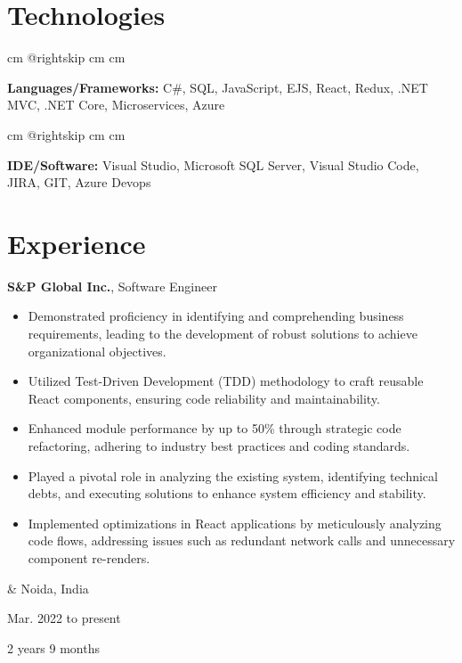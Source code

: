 \documentclass[10pt, letterpaper]{article}
\newenvironment{highlights}{
        \begin{itemize}[
                topsep=0pt,
                parsep=0.10 cm,
                partopsep=0pt,
                itemsep=0pt,
                after=\vspace{-1\baselineskip},
                leftmargin=0.4 cm + 3pt
            ]
    }{
        \end{itemize}
    } %
\let\originalTabularx\tabularx
\let\originalEndTabularx\endtabularx
\renewenvironment{tabularx}{\bgroup\centering\originalTabularx}{\originalEndTabularx\par\egroup}
\begin{document}
    
    \section{Technologies}

        \begingroup{} cm
        \advance\csname @rightskip cm
        \advance{} cm

        \textbf{Languages/Frameworks:} C\#, SQL, JavaScript, EJS, React, Redux, .NET MVC, .NET Core, Microservices, Azure \par\endgroup

        \vspace{0.2 cm}
        \begingroup{} cm
        \advance\csname @rightskip cm
        \advance{} cm

        \textbf{IDE/Software:} Visual Studio, Microsoft SQL Server, Visual Studio Code, JIRA, GIT, Azure Devops \par\endgroup


    
    \section{Experience}

        \begin{tabularx}{
            \textwidth-0.4 cm-0.13cm
        }{
            K{0.2 cm}
            R{4.1 cm}
        }
            \textbf{S\&P Global Inc.}, Software Engineer

            \vspace{0.10 cm}

            \begin{highlights}
                \item Demonstrated proficiency in identifying and comprehending business requirements, leading to the development of robust solutions to achieve organizational objectives.
                \item Utilized Test-Driven Development (TDD) methodology to craft reusable React components, ensuring code reliability and maintainability.
                \item Enhanced module performance by up to 50\% through strategic code refactoring, adhering to industry best practices and coding standards.
                \item Played a pivotal role in analyzing the existing system, identifying technical debts, and executing solutions to enhance system efficiency and stability.
                \item Implemented optimizations in React applications by meticulously analyzing code flows, addressing issues such as redundant network calls and unnecessary component re-renders.
            \end{highlights}
            &
            Noida, India

            Mar. 2022 to present

            2 years 9 months
        \end{tabularx}
\end{document}
